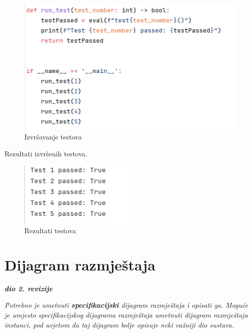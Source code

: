 			\begin{figure}[H]
				\includegraphics[width=\textwidth]{slike/selenium_running.png}
				\centering
				\caption{Izvršavanje testova}
				\label{fig:izvrsavanje-testova}
			\end{figure}
		
			Rezultati izvršenih testova.
			
			\begin{figure}[H]
				\includegraphics[width=\textwidth]{slike/selenium_results.png}
				\centering
				\caption{Rezultati testova}
				\label{fig:rezultati-testova}
			\end{figure}
				
			
			
			
			\eject 
		
		
		\section{Dijagram razmještaja}
			
			\textbf{\textit{dio 2. revizije}}
			
			 \textit{Potrebno je umetnuti \textbf{specifikacijski} dijagram razmještaja i opisati ga. Moguće je umjesto specifikacijskog dijagrama razmještaja umetnuti dijagram razmještaja instanci, pod uvjetom da taj dijagram bolje opisuje neki važniji dio sustava.}
			
